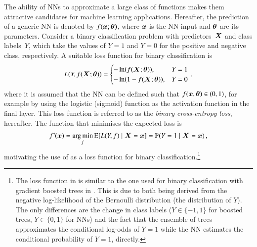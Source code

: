 
The ability of NNs to approximate a large class of functions makes them
attractive candidates for machine learning applications. Hereafter, the
prediction of a generic NN is denoted by $f(\bm{x}; \bm{\theta})$, where
$\bm{x}$ is the NN input and $\bm{\theta}$ are its parameters. Consider a
binary classification problem with predictors~$\bm{X}$ and class labels~$Y$,
which take the values of $Y = 1$ and $Y = 0$ for the positive and negative
class, respectively. A suitable loss function for binary classification is
\begin{align}
  L(Y, f(\bm{X}; \bm{\theta})) =
  \begin{cases}
    -\ln\mathopen{}\left( f(\bm{X}; \bm{\theta}) \right)\mathclose{},       & Y = 1 \\
    -\ln\mathopen{}\left( 1 - f(\bm{X}; \bm{\theta}) \right)\mathclose{},   & Y = 0 \\
  \end{cases} \,\text{,}
  \label{eq:loss_bce}
\end{align}
where it is assumed that the NN can be defined such that
$f(\bm{x}, \bm{\theta}) \in (0, 1)$, for example by using the logistic
(sigmoid) function as the activation function in the final layer. This loss
function is referred to as the \emph{binary cross-entropy loss}, hereafter. The
function that minimises the expected loss is
\begin{align*}
  f^{*\!}(\bm{x})
  = \operatorname*{arg\,min}_{f} \operatorname{E}[ L(Y, f) \mid \bm{X} = \bm{x} ]
  = \mathbb{P}(Y = 1 \mid \bm{X} = \bm{x}) \,\text{,}
\end{align*}
motivating the use of  as a loss function for binary
classification.\footnote{The loss function in  is similar to
  the one used for binary classification with gradient boosted trees in
  . This is due to both being derived from the negative
  log-likelihood of the Bernoulli distribution (the distribution of $Y$). The
  only differences are the change in class labels ($Y \in \{-1, 1\}$ for boosted
  trees, $Y \in \{0, 1\}$ for NNs) and the fact that the ensemble of trees
  approximates the conditional log-odds of $Y = 1$ while the NN estimates the
  conditional probability of $Y = 1$, directly.}

